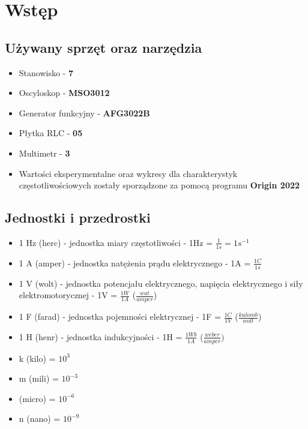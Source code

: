 \chapter{Wstęp}

\section{Używany sprzęt oraz narzędzia}

\begin{itemize}
    \item Stanowisko - \textbf{7}
    \item Oscyloskop - \textbf{MSO3012}
    \item Generator funkcyjny - \textbf{AFG3022B}
    \item Płytka RLC - \textbf{05}
    \item Multimetr - \textbf{3}
    \item Wartości eksperymentalne oraz wykresy dla charakterystyk częstotliwościowych zostały sporządzone za pomocą programu \textbf{Origin 2022}
\end{itemize}

\section{Jednostki i przedrostki}

\begin{itemize}
    \item 1 Hz (herc) - jednostka miary częstotliwości - 1Hz = $\frac{1}{1s} = 1s^{-1}$
    \item 1 A (amper) - jednostka natężenia prądu elektrycznego - 1A = $\frac{1C}{1s}$
    \item 1 V (wolt) - jednostka potencjału elektrycznego, napięcia elektrycznego i siły elektromotorycznej - 1V = $\frac{1W}{1A}$ ($\frac{wat}{amper}$)
    \item 1 F (farad) - jednostka pojemności elektrycznej - 1F = $\frac{1C}{1V}$ ($\frac{kulomb}{wolt}$)
    \item 1 H (henr) - jednostka indukcyjności - 1H = $\frac{1 Wb}{1 A}$ ($\frac{weber}{amper})$
\end{itemize}

\begin{itemize}
    \item k (kilo) = $10^3$
    \item m (mili) = $10^{-3}$
    \item \micro (micro) = $10^{-6}$
    \item n (nano) = $10^{-9}$
\end{itemize}

